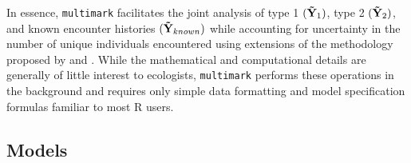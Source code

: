 \documentclass[12pt]{article}
\begin{document}
In essence, \verb|multimark| facilitates the joint analysis of type 1 $({\bf {\tilde Y}}_1)$, type 2 $({\bf {\tilde Y}}_2)$, and known encounter histories $({\bf {\tilde Y}}_{known})$ while accounting for uncertainty in the number of unique individuals encountered using extensions of the methodology proposed by \cite{BonnerHolmberg2013} and \cite{McClintockEtAl2013a}. While the mathematical and computational details are generally of little interest to ecologists, \verb|multimark| performs these operations in the background and requires only simple data formatting and model specification formulas familiar to most R users.

\subsection{Models}
\end{document}
